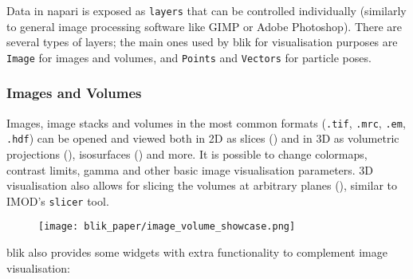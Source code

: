 Data in napari is exposed as \texttt{layers} that can be controlled individually (similarly to general image processing software like GIMP or Adobe Photoshop). There are several types of layers; the main ones used by blik for visualisation purposes are \texttt{Image} for images and volumes, and \texttt{Points} and \texttt{Vectors} for particle poses.

\subsubsection{Images and Volumes}\label{images-and-volumes}

Images, image stacks and volumes in the most common formats (\texttt{.tif}, \texttt{.mrc}, \texttt{.em}, \texttt{.hdf}) can be opened and viewed both in 2D as slices () and in 3D as volumetric projections (), isosurfaces () and more. It is possible to change colormaps, contrast limits, gamma and other basic image visualisation parameters. 3D visualisation also allows for slicing the volumes at arbitrary planes (), similar to IMOD's \texttt{slicer} tool.

\begin{figure}
    \centering
    \texttt{[image: blik\_paper/image\_volume\_showcase.png]}
    \label{images-showcase}
\end{figure}

blik also provides some widgets with extra functionality to complement image visualisation:

